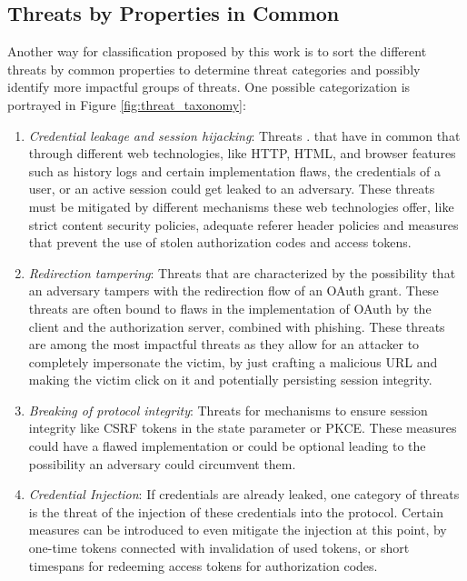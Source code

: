\subsection{Threats by Properties in Common}
Another way for classification proposed by this work is to sort the different threats by common properties to determine threat categories and possibly identify more impactful groups of threats. One possible categorization is portrayed in Figure \ref{fig:threat_taxonomy}:
\begin{enumerate}
	\item \emph{Credential leakage and session hijacking}: Threats . that have in common that through different web technologies, like HTTP, HTML, and browser features such as history logs and certain implementation flaws, the credentials of a user, or an active session could get leaked to an adversary. These threats must be mitigated by different mechanisms these web technologies offer, like strict content security policies, adequate referer header policies and measures that prevent the use of stolen authorization codes and access tokens. 
	\item \emph{Redirection tampering}: Threats that are characterized by the possibility that an adversary tampers with the redirection flow of an OAuth grant. These threats are often bound to flaws in the implementation of OAuth by the client and the authorization server, combined with phishing. These threats are among the most impactful threats as they allow for an attacker to completely impersonate the victim, by just crafting a malicious URL and making the victim click on it and potentially persisting session integrity.
	\item \emph{Breaking of protocol integrity}: Threats for mechanisms to ensure session integrity like CSRF tokens in the state parameter or PKCE. These measures could have a flawed implementation or could be optional leading to the possibility an adversary could circumvent them.
	\item \emph{Credential Injection}: If credentials are already leaked, one category of threats is the threat of the injection of these credentials into the protocol. Certain measures can be introduced to even mitigate the injection at this point, by one-time tokens connected with invalidation of used tokens, or short timespans for redeeming access tokens for authorization codes.
\end{enumerate}

